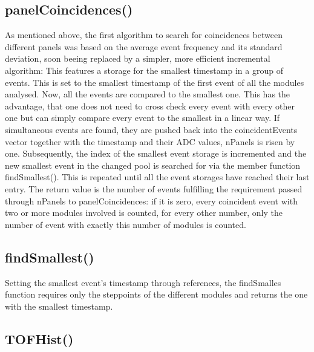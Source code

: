     \subsection{panelCoincidences()}
    \label{ch:Analysis software:sec:methods of the class run:subsec:panelCoincidences()}

    As mentioned above, the first algorithm to search for coincidences between different panels was based on the average event frequency and its standard deviation, soon beeing replaced by a simpler, more efficient incremental algorithm:
    This features a storage for the smallest timestamp in a group of events.  This is set to the smallest timestamp of the first event of all the modules analysed. Now, all the events are compared to the smallest one. This has the advantage, that one does not need to cross check every event with every other one but can simply compare every event to the smallest in a linear way. If simultaneous events are found, they are pushed back into the coincidentEvents vector together with the timestamp and their ADC values, nPanels is risen by one. Subsequently, the index of the smallest event storage is incremented and the new smallest event in the changed pool is searched for via the member function findSmallest(). This is repeated until all the event storages have reached their last entry.
    The return value is the number of events fulfilling the requirement passed through nPanels to panelCoincidences: if it is zero, every coincident event with two or more modules involved is counted, for every other number, only the number of event with exactly this number of modules is counted.

    \subsection{findSmallest()}
    \label{ch:Analysis software:sec:methods of the class run:subsec:findSmallest()}
    
    Setting the smallest event's timestamp through references, the findSmalles function requires only the steppoints of the different modules and returns the one with the smallest timestamp. 
    
    \subsection{TOFHist()}
    \label{ch:Analysis software:sec:methods of the class run:subsec:TOFHist()}
    
